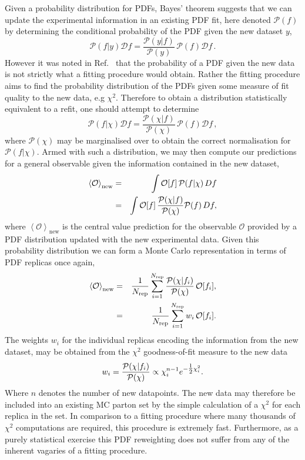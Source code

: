 Given a probability distribution for PDFs, Bayes' theorem suggests that we can update the experimental information in an existing PDF fit, here denoted $\mathcal{P}(f)$ by determining the conditional probability of the PDF given the new dataset ${y}$,  
\begin{equation}
  {\mathcal P}(f|y) \mathcal Df  =  \frac{{\mathcal P}(y|f)}{{\mathcal P}(y)} \, {\mathcal P}(f) \mathcal Df\, .   \label{eq:3}
\end{equation}
However it was noted in Ref.~\cite{Ball:2010gb} that the probability of a PDF given the new data is not strictly what a fitting procedure would obtain. Rather the fitting procedure aims to find the probability distribution of the PDFs given some measure of fit quality to the new data, e.g $\chi^2$. Therefore to obtain a distribution statistically equivalent to a refit, one should attempt to determine
\begin{equation}
  \label{eq:3}
  {\mathcal P}(f|\chi) \mathcal Df =  \frac{{\mathcal P}(\chi |f)}{{\mathcal P}(\chi)} \, {\mathcal P}(f) \mathcal Df\, ,
\end{equation}
where $\mathcal{P}(\chi)$ may be marginalised over to obtain the correct normalisation for ${\mathcal P}(f|\chi)$. Armed with such a distribution, we may then compute our predictions for a general observable given the information contained in the new dataset,
\begin{eqnarray}
\left<\mathcal{O}\right>_{\text{new}}&=&\int \mathcal{O}[f] \,
\mathcal{P}(f|\chi)\,Df\nonumber\\ &=&\int \mathcal{O}[f]
\,{{\mathcal{P}(\chi|f)}\over {\mathcal{P}(\chi)}}
\mathcal{P}(f)\,Df,\nonumber
\end{eqnarray}
where $\left<\mathcal{O}\right>_{\text{new}}$ is the central value prediction for the observable $\mathcal{O}$ provided by a PDF distribution updated with the new experimental data. Given this probability distribution we can form a Monte Carlo representation in terms of PDF replicas once again,
\begin{eqnarray} 
\left<\mathcal{O}\right>_{\text{new}}&=&{{1}\over {N_{\text{rep}}}}\sum_{i=1}^{N_{\text{rep}}}
{{\mathcal{P}(\chi|f_i)}\over {\mathcal{P}(\chi)}}\,\mathcal{O}[f_i], \nonumber \\
&=& {{1}\over {N_{\text{rep}}}}\sum_{i=1}^{N_{\text{rep}}} w_i\,\mathcal{O}[f_i]. 
\label{eq:avgnewx}
\end{eqnarray}
The weights $w_i$ for the individual replicas encoding the information from the new dataset, may be obtained from the $\chi^2$ goodness-of-fit measure to the new data
\begin{equation}
w_i = {{\mathcal{P}(\chi|f_i)}\over {\mathcal{P}(\chi)}} \propto \chi_i^{n-1} e^{-\hbox{${{1}\over {2}}$}\chi_i^2}.
\label{eq:weightscsq}
\end{equation}
Where $n$ denotes the number of new datapoints. The new data may therefore be included into an existing MC parton set by the simple calculation of a $\chi^2$ for each replica in the set. In comparison to a fitting procedure where many thousands of $\chi^2$ computations are required, this procedure is extremely fast. Furthermore, as a purely statistical exercise
this PDF reweighting does not suffer from any of the inherent vagaries of a fitting procedure.

